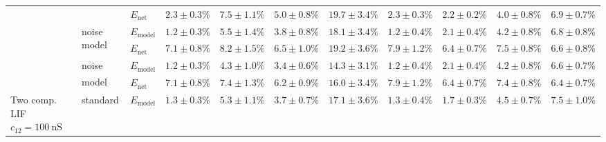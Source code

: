 \begin{sidewaystable}
\begin{tabular}{p{2.2cm} p{1.7cm} l r r r r r r r r }
	\\
	& & 
	$E_\mathrm{net}$ &
	\cellcolor{White!100!SteelBlue}$\mathbf{2.3 \pm 0.3\%}$ & \cellcolor{White!94!SteelBlue}$7.5 \pm 1.1\%$ & \cellcolor{White!100!SteelBlue}$\mathbf{5.0 \pm 0.8\%}$ & \cellcolor{White!69!SteelBlue}$19.7 \pm 3.4\%$ & \cellcolor{White!100!SteelBlue}$\mathbf{2.3 \pm 0.3\%}$ & \cellcolor{White!100!SteelBlue}$\mathbf{2.2 \pm 0.2\%}$ & \cellcolor{White!100!SteelBlue}$\mathbf{4.0 \pm 0.8\%}$ & \cellcolor{White!88!SteelBlue}$6.9 \pm 0.7\%$
	\\\cmidrule(l){2-11}
	&
	\multirow{2}{1.7cm}{\raggedleft %
	noise model} &
	$E_\mathrm{model}$ & 
	\color{Gray}$1.2 \pm 0.3\%$ & \color{Gray}$5.5 \pm 1.4\%$ & \color{Gray}$3.8 \pm 0.8\%$ & \color{Gray}$18.1 \pm 3.4\%$ & \color{Gray}$1.2 \pm 0.4\%$ & \color{Gray}$2.1 \pm 0.4\%$ & \color{Gray}$4.2 \pm 0.8\%$ & \color{Gray}$6.8 \pm 0.8\%$
	\\
	& & 
	$E_\mathrm{net}$ &
	\cellcolor{White!50!SteelBlue}$7.1 \pm 0.8\%$ & \cellcolor{White!88!SteelBlue}$8.2 \pm 1.5\%$ & \cellcolor{White!82!SteelBlue}$6.5 \pm 1.0\%$ & \cellcolor{White!75!SteelBlue}$19.2 \pm 3.6\%$ & \cellcolor{White!50!SteelBlue}$7.9 \pm 1.2\%$ & \cellcolor{White!57!SteelBlue}$6.4 \pm 0.7\%$ & \cellcolor{White!69!SteelBlue}$7.5 \pm 0.8\%$ & \cellcolor{White!94!SteelBlue}$6.6 \pm 0.8\%$
	\\\cmidrule(l){2-11}
	&
	\multirow{2}{1.7cm}{\raggedleft %
	noise model\textsuperscript{\dag}} &
	$E_\mathrm{model}$ & 
	\color{Gray}$\mathbf{1.2 \pm 0.3\%}$ & \color{Gray}$4.3 \pm 1.0\%$ & \color{Gray}$3.4 \pm 0.6\%$ & \color{Gray}$14.3 \pm 3.1\%$ & \color{Gray}$1.2 \pm 0.4\%$ & \color{Gray}$2.1 \pm 0.4\%$ & \color{Gray}$\mathbf{4.2 \pm 0.8\%}$ & \color{Gray}$6.6 \pm 0.7\%$
	\\
	& & 
	$E_\mathrm{net}$ &
	\cellcolor{White!44!SteelBlue}$7.1 \pm 0.8\%$ & \cellcolor{White!100!SteelBlue}$\mathbf{7.4 \pm 1.3\%}$ & \cellcolor{White!88!SteelBlue}$6.2 \pm 0.9\%$ & \cellcolor{White!88!SteelBlue}$16.0 \pm 3.4\%$ & \cellcolor{White!44!SteelBlue}$7.9 \pm 1.2\%$ & \cellcolor{White!63!SteelBlue}$6.4 \pm 0.7\%$ & \cellcolor{White!75!SteelBlue}$7.4 \pm 0.8\%$ & \cellcolor{White!100!SteelBlue}$\mathbf{6.4 \pm 0.7\%}$
	\\\midrule
	\multirow{8}{2.2cm}{\raggedleft %
	Two comp. LIF $c_{12} = \SI{100}{\nano\siemens}$} &
	\multirow{2}{1.7cm}{\raggedleft %
	standard} &
	$E_\mathrm{model}$ & 
	\color{Gray}$1.3 \pm 0.3\%$ & \color{Gray}$5.3 \pm 1.1\%$ & \color{Gray}$3.7 \pm 0.7\%$ & \color{Gray}$17.1 \pm 3.6\%$ & \color{Gray}$1.3 \pm 0.4\%$ & \color{Gray}$1.7 \pm 0.3\%$ & \color{Gray}$4.5 \pm 0.7\%$ & \color{Gray}$7.5 \pm 1.0\%$

\end{tabular}
\end{sidewaystable}
